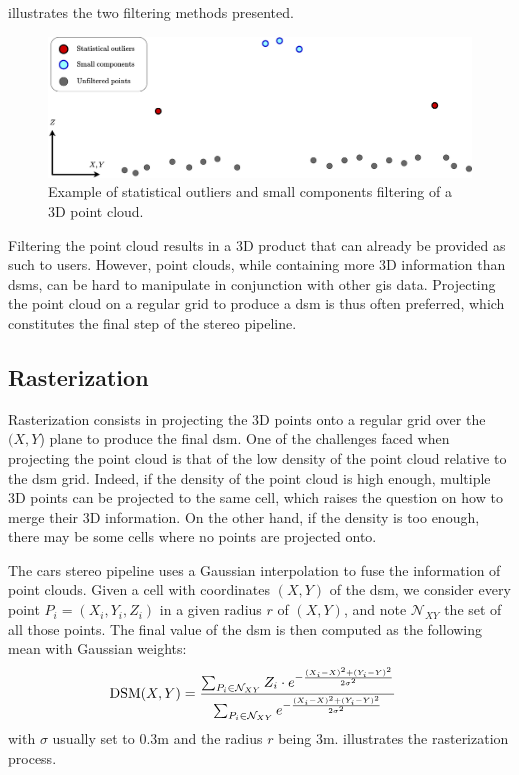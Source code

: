  illustrates the two filtering methods presented.

\begin{figure}
    \centering
    \includegraphics[width=\linewidth]{Images/Chap_1/Point_cloud_filtering.png}
    \caption{Example of statistical outliers and small components filtering of a 3D point cloud.}
    \label{fig:point_cloud_filtering}
\end{figure}

Filtering the point cloud results in a 3D product that can already be provided as such to users. However, point clouds, while containing more 3D information than \acrshort{dsm}s, can be hard to manipulate in conjunction with other \acrshort{gis} data. Projecting the point cloud on a regular grid to produce a \acrshort{dsm} is thus often preferred, which constitutes the final step of the stereo pipeline.

\subsection{Rasterization}\label{sec:rasterization}
Rasterization consists in projecting the 3D points onto a regular grid over the $(X,Y$) plane to produce the final \acrshort{dsm}. One of the challenges faced when projecting the point cloud is that of the low density of the point cloud relative to the \acrshort{dsm} grid. Indeed, if the density of the point cloud is high enough, multiple 3D points can be projected to the same cell, which raises the question on how to merge their 3D information. On the other hand, if the density is too enough, there may be some cells where no points are projected onto. 

The \acrshort{cars} stereo pipeline uses a Gaussian interpolation to fuse the information of point clouds. Given a cell with coordinates $(X,Y)$ of the \acrshort{dsm}, we consider every point $P_i=(X_i, Y_i, Z_i)$ in a given radius $r$ of $(X,Y)$, and note $\mathcal{N}_{XY}$ the set of all those points. The final value of the \acrshort{dsm} is then computed as the following mean with Gaussian weights:
\begin{align}\label{eq:rasterization}
    \mathrm{DSM}(X,Y) &= \frac{\sum_{P_i\in\mathcal{N}_{XY}}Z_i\cdot e^{-\frac{(X_i-X)^2+(Y_i-Y)^2}{2\sigma^2}}}{\sum_{P_i\in\mathcal{N}_{XY}} e^{-\frac{(X_i-X)^2+(Y_i-Y)^2}{2\sigma^2}}}
\end{align}
with $\sigma$ usually set to $0.3$m and the radius $r$ being $3$m.  illustrates the rasterization process.

